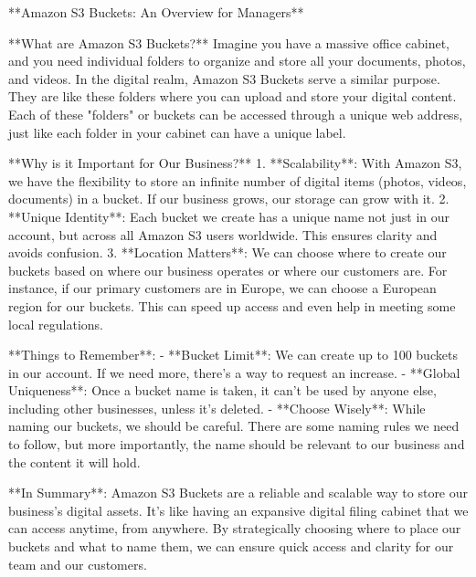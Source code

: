 **Amazon S3 Buckets: An Overview for Managers**

**What are Amazon S3 Buckets?**
Imagine you have a massive office cabinet, and you need individual folders to organize and store all your documents, photos, and videos. In the digital realm, Amazon S3 Buckets serve a similar purpose. They are like these folders where you can upload and store your digital content. Each of these "folders" or buckets can be accessed through a unique web address, just like each folder in your cabinet can have a unique label.

**Why is it Important for Our Business?**
1. **Scalability**: With Amazon S3, we have the flexibility to store an infinite number of digital items (photos, videos, documents) in a bucket. If our business grows, our storage can grow with it.
2. **Unique Identity**: Each bucket we create has a unique name not just in our account, but across all Amazon S3 users worldwide. This ensures clarity and avoids confusion.
3. **Location Matters**: We can choose where to create our buckets based on where our business operates or where our customers are. For instance, if our primary customers are in Europe, we can choose a European region for our buckets. This can speed up access and even help in meeting some local regulations.

**Things to Remember**:
- **Bucket Limit**: We can create up to 100 buckets in our account. If we need more, there's a way to request an increase.
- **Global Uniqueness**: Once a bucket name is taken, it can't be used by anyone else, including other businesses, unless it's deleted.
- **Choose Wisely**: While naming our buckets, we should be careful. There are some naming rules we need to follow, but more importantly, the name should be relevant to our business and the content it will hold.

**In Summary**:
Amazon S3 Buckets are a reliable and scalable way to store our business's digital assets. It's like having an expansive digital filing cabinet that we can access anytime, from anywhere. By strategically choosing where to place our buckets and what to name them, we can ensure quick access and clarity for our team and our customers.